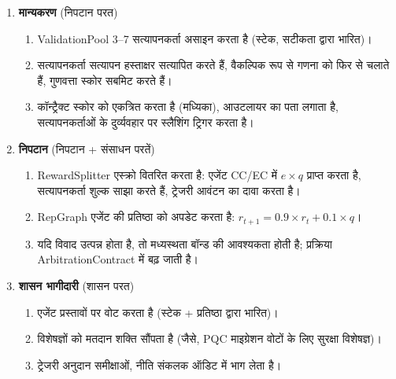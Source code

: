 \documentclass[11pt]{article}
\begin{document}
\begin{enumerate}
\begin{enumerate}[label=\alph*.]
    \end{enumerate}
  \item \textbf{मान्यकरण} (निपटान परत)
    \begin{enumerate}[label=\alph*.]
      \item ValidationPool 3--7 सत्यापनकर्ता असाइन करता है (स्टेक, सटीकता द्वारा भारित)।
      \item सत्यापनकर्ता सत्यापन हस्ताक्षर सत्यापित करते हैं, वैकल्पिक रूप से गणना को फिर से चलाते हैं, गुणवत्ता स्कोर सबमिट करते हैं।
      \item कॉन्ट्रैक्ट स्कोर को एकत्रित करता है (मध्यिका), आउटलायर का पता लगाता है, सत्यापनकर्ताओं के दुर्व्यवहार पर स्लैशिंग ट्रिगर करता है।
    \end{enumerate}
  \item \textbf{निपटान} (निपटान + संसाधन परतें)
    \begin{enumerate}[label=\alph*.]
      \item RewardSplitter एस्क्रो वितरित करता है: एजेंट CC/EC में $e \times q$ प्राप्त करता है, सत्यापनकर्ता शुल्क साझा करते हैं, ट्रेजरी आवंटन का दावा करता है।
      \item RepGraph एजेंट की प्रतिष्ठा को अपडेट करता है: $r_{t+1} = 0.9 \times r_t + 0.1 \times q$।
      \item यदि विवाद उत्पन्न होता है, तो मध्यस्थता बॉन्ड की आवश्यकता होती है; प्रक्रिया ArbitrationContract में बढ़ जाती है।
    \end{enumerate}
  \item \textbf{शासन भागीदारी} (शासन परत)
    \begin{enumerate}[label=\alph*.]
      \item एजेंट प्रस्तावों पर वोट करता है (स्टेक + प्रतिष्ठा द्वारा भारित)।
      \item विशेषज्ञों को मतदान शक्ति सौंपता है (जैसे, PQC माइग्रेशन वोटों के लिए सुरक्षा विशेषज्ञ)।
      \item ट्रेजरी अनुदान समीक्षाओं, नीति संकलक ऑडिट में भाग लेता है।
    \end{enumerate}
\end{enumerate}
\end{document}

